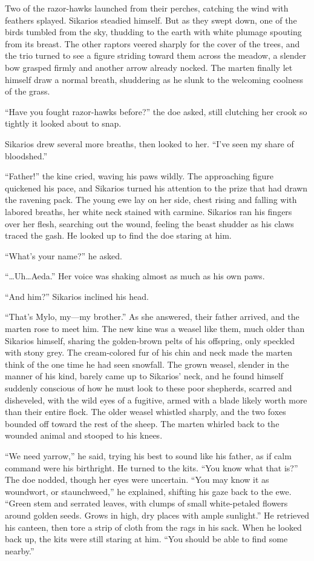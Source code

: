Two of the razor-hawks launched from their perches, catching the wind with feathers splayed. Sikarios steadied himself. But as they swept down, one of the birds tumbled from the sky, thudding to the earth with white plumage spouting from its breast. The other raptors veered sharply for the cover of the trees, and the trio turned to see a figure striding toward them across the meadow, a slender bow grasped firmly and another arrow already nocked. The marten finally let himself draw a normal breath, shuddering as he slunk to the welcoming coolness of the grass.

``Have you fought razor-hawks before?'' the doe asked, still clutching her crook so tightly it looked about to snap.

Sikarios drew several more breaths, then looked to her. ``I've seen my share of bloodshed.''

``Father!'' the kine cried, waving his paws wildly. The approaching figure quickened his pace, and Sikarios turned his attention to the prize that had drawn the ravening pack. The young ewe lay on her side, chest rising and falling with labored breaths, her white neck stained with carmine. Sikarios ran his fingers over her flesh, searching out the wound, feeling the beast shudder as his claws traced the gash. He looked up to find the doe staring at him.

``What's your name?'' he asked.

``\ldots Uh\ldots Aeda.'' Her voice was shaking almost as much as his own paws.

``And him?'' Sikarios inclined his head.

``That's Mylo, my---my brother.'' As she answered, their father arrived, and the marten rose to meet him. The new kine was a weasel like them, much older than Sikarios himself, sharing the golden-brown pelts of his offspring, only speckled with stony grey. The cream-colored fur of his chin and neck made the marten think of the one time he had seen snowfall. The grown weasel, slender in the manner of his kind, barely came up to Sikarios' neck, and he found himself suddenly conscious of how he must look to these poor shepherds, scarred and disheveled, with the wild eyes of a fugitive, armed with a blade likely worth more than their entire flock. The older weasel whistled sharply, and the two foxes bounded off toward the rest of the sheep. The marten whirled back to the wounded animal and stooped to his knees.

``We need yarrow,'' he said, trying his best to sound like his father, as if calm command were his birthright. He turned to the kits. ``You know what that is?'' The doe nodded, though her eyes were uncertain. ``You may know it as woundwort, or staunchweed,'' he explained, shifting his gaze back to the ewe. ``Green stem and serrated leaves, with clumps of small white-petaled flowers around golden seeds. Grows in high, dry places with ample sunlight.'' He retrieved his canteen, then tore a strip of cloth from the rags in his sack. When he looked back up, the kits were still staring at him. ``You should be able to find some nearby.''

